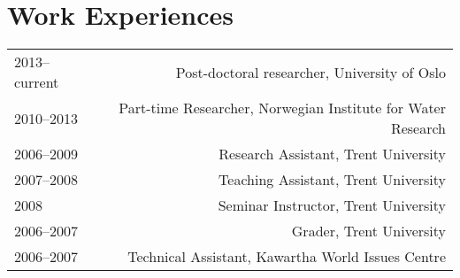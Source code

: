 \section*{Work Experiences}
\begin{tabular}{L!{\VRule}R}  
2013--current & Post-doctoral researcher, University of Oslo \\
2010--2013 & Part-time Researcher, Norwegian Institute for Water Research  \\
2006--2009 & Research Assistant, Trent University \\
2007--2008 & Teaching Assistant, Trent University \\
2008 & Seminar Instructor, Trent University \\
2006--2007 & Grader, Trent University \\
2006--2007 & Technical Assistant, Kawartha World Issues Centre \\
\end{tabular}
